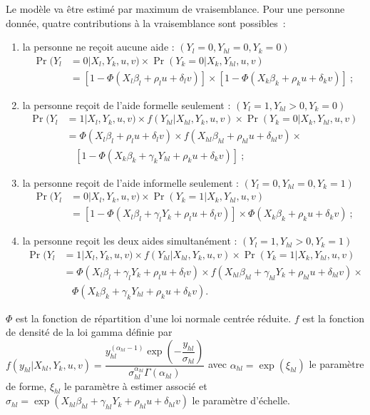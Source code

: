 \begin{Article}
\begin{refsection}[Bonnal]
Le modèle va être estimé par maximum de vraisemblance. Pour une personne donnée, quatre contributions à la vraisemblance sont possibles~:
\begin{enumerate}
	\item la personne ne reçoit aucune aide : $(Y_{l} = 0, Y_{hl} = 0, Y_{k} = 0)$
	\begin{align*}
		\Pr(Y_{l}&=0|X_{l},Y_{k},u,v) \times \Pr(Y_{k}=0|X_{k},Y_{hl},u,v)\\
		& = [1 - \Phi(X_{l}\beta_{l} + \rho_{l}u + \delta_{l}v)] \times [1 - \Phi(X_{k}\beta_{k} + \rho_{k}u + \delta_{k}v)]~;
	\end{align*}
	\item la personne reçoit de l'aide formelle seulement : $(Y_{l} = 1, Y_{hl} > 0, Y_{k} = 0)$
	\begin{align*}
		\Pr(Y_{l} &=1|X_{l},Y_{k},u,v) \times f(Y_{hl}|X_{hl},Y_{k},u,v) \times \Pr(Y_{k}=0|X_{k},Y_{hl},u,v) \\
		& = \Phi(X_{l}\beta_{l} +\rho_{l}u + \delta_{l}v) \times f(X_{hl}\beta_{hl} + \rho_{hl}u + \delta_{hl}v) \times \\
		&\ \ \ \ [1 - \Phi(X_{k}\beta_{k} + \gamma_{k}Y_{hl} + \rho_{k}u + \delta_{k}v)]~;
	\end{align*}
	\item la personne reçoit de l'aide informelle seulement : $(Y_{l} = 0, Y_{hl} = 0, Y_{k} = 1)$
	\begin{align*}
		\Pr(Y_{l}&=0|X_{l},Y_{k},u,v) \times \Pr(Y_{k}=1|X_{k},Y_{hl},u,v) \\
		& = [1 - \Phi(X_{l}\beta_{l} +\gamma_{l}Y_{k}+ \rho_{l}u + \delta_{l}v)]  \times \Phi(X_{k}\beta_{k} +  \rho_{k}u + \delta_{k}v)~;
	\end{align*}
	\item la personne reçoit les deux aides simultanément : $(Y_{l} = 1, Y_{hl} > 0, Y_{k} = 1)$
	\begin{align*}
	\Pr(Y_{l} &=1|X_{l},Y_{k},u,v) \times f(Y_{hl}|X_{hl},Y_{k},u,v) \times \Pr(Y_{k}=1|X_{k},Y_{hl},u,v) \\
		&= \Phi(X_{l}\beta_{l} + \gamma_{l}Y_{k} +  \rho_{l}u + \delta_{l}v) \times f(X_{hl}\beta_{hl} + \gamma_{hl}Y_{k} +  \rho_{hl}u + \delta_{hl}v) \times \\
		&\ \ \ \ \Phi(X_{k}\beta_{k} + \gamma_{k}Y_{hl} +  \rho_{k}u + \delta_{k}v).
	\end{align*}
\end{enumerate}
$\Phi$ est la fonction de répartition d'une loi normale centrée réduite. $f$ est la fonction de densité de la loi gamma définie par $f(y_{hl}|X_{hl},Y_k,u,v)=\dfrac{y_{hl}^{(\alpha_{hl}-1)}\exp{\left(-\dfrac{y_{hl}}{\sigma_{hl}}\right)}}{\sigma_{hl}^{\alpha_{hl}}\Gamma(\alpha_{hl})}$ avec $\alpha_{hl}=\exp{(\xi_{hl})}$ le paramètre de forme, $\xi_{hl}$ le paramètre à estimer associé et $\sigma_{hl}=\exp{(X_{hl}\beta_{hl}+\gamma_{hl}Y_{k}+\rho_{hl}u+\delta_{hl}v)}$ le paramètre d’échelle.


\end{refsection}
\end{Article}
